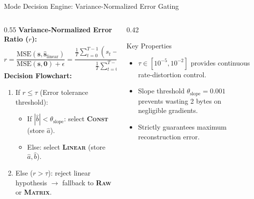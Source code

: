 \documentclass[aspectratio=169, 10pt]{beamer}
\begin{document}
\begin{frame}{Mode Decision Engine: Variance-Normalized Error Gating}
    \begin{columns}
        \begin{column}{0.55\textwidth}
            \textbf{Variance-Normalized Error Ratio ($r$):}
            \begin{equation}
                r = \frac{\text{MSE}(\mathbf{s}, \hat{\mathbf{s}}_{\text{linear}})}{\text{MSE}(\mathbf{s}, \mathbf{0}) + \epsilon} = \frac{\frac{1}{T} \sum_{t=0}^{T-1} (s_t - (\hat{a} + \hat{b}t))^2}{\frac{1}{T} \sum_{t=0}^{T-1} s_t^2 + \epsilon}
            \end{equation}
            \textbf{Decision Flowchart:}
            \begin{enumerate}
                \item If $r \le \tau$ (Error tolerance threshold):
                \begin{itemize}
                    \item If $|\hat{b}| < \theta_{\text{slope}}$: select \textbf{\textsc{Const}} (store $\hat{a}$).
                    \item Else: select \textbf{\textsc{Linear}} (store $\hat{a}, \hat{b}$).
                \end{itemize}
                \item Else ($r > \tau$): reject linear hypothesis $\rightarrow$ fallback to \textbf{\textsc{Raw}} or \textbf{\textsc{Matrix}}.
            \end{enumerate}
        \end{column}
        \begin{column}{0.42\textwidth}
            \begin{block}{Key Properties}
                \begin{itemize}
                    \item $\tau \in [10^{-5}, 10^{-2}]$ provides continuous rate-distortion control.
                    \item Slope threshold $\theta_{\text{slope}} = 0.001$ prevents wasting 2 bytes on negligible gradients.
                    \item Strictly guarantees maximum reconstruction error.
                \end{itemize}
            \end{block}
        \end{column}
    \end{columns}
\end{frame}
\end{document}
